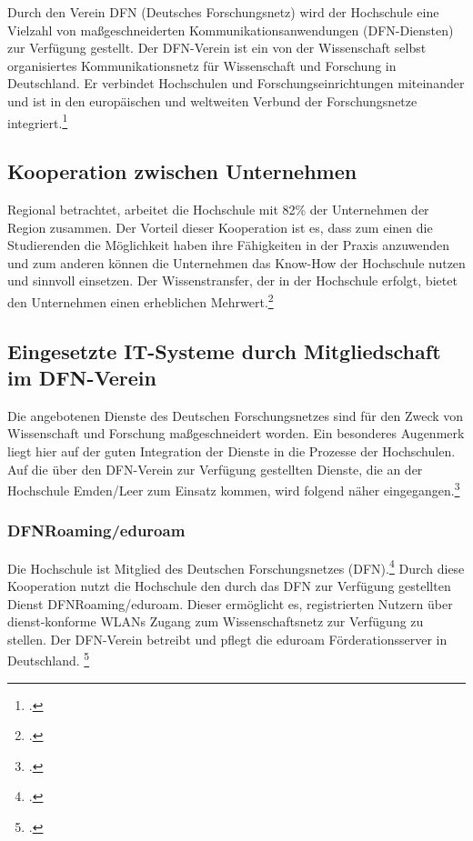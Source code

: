 Durch den Verein DFN (Deutsches Forschungsnetz) wird der Hochschule eine Vielzahl von maßgeschneiderten Kommunikationsanwendungen (DFN-Diensten) zur Verfügung gestellt. Der DFN-Verein ist ein von der Wissenschaft selbst organisiertes Kommunikationsnetz für Wissenschaft und Forschung in Deutschland. Er verbindet Hochschulen und Forschungseinrichtungen miteinander und ist in den europäischen und weltweiten  Verbund der Forschungsnetze integriert.\footcite[Vgl.][]{dfn_home_2015}

\subsection{Kooperation zwischen Unternehmen}
Regional betrachtet, arbeitet die Hochschule mit 82\% der Unternehmen der Region zusammen. Der Vorteil dieser Kooperation ist es, dass zum einen die Studierenden die Möglichkeit haben ihre Fähigkeiten in der Praxis anzuwenden und zum anderen können die Unternehmen das Know-How  der Hochschule nutzen und sinnvoll einsetzen. Der Wissenstransfer, der in der Hochschule erfolgt, bietet den Unternehmen einen erheblichen Mehrwert.\footcite[Vgl.][]{hsel_artikel_kooperation_unternehmen_2014}

\subsection{Eingesetzte IT-Systeme durch Mitgliedschaft im DFN-Verein}
Die angebotenen Dienste des Deutschen Forschungsnetzes sind für den Zweck von Wissenschaft und Forschung maßgeschneidert worden. Ein besonderes Augenmerk liegt hier auf der guten Integration der Dienste in die Prozesse der Hochschulen.  Auf die über den DFN-Verein zur Verfügung gestellten Dienste, die an der Hochschule Emden/Leer zum Einsatz kommen, wird folgend näher eingegangen.\footcite[Vgl.][]{dfn_dienste_2014}

\subsubsection{DFNRoaming/eduroam}
Die Hochschule ist Mitglied des Deutschen Forschungsnetzes (DFN).\footcite{dfn_mitgleider_2012} Durch diese Kooperation nutzt die Hochschule den durch das DFN zur Verfügung gestellten Dienst DFNRoaming/eduroam. Dieser ermöglicht es, registrierten Nutzern über dienst-konforme WLANs Zugang zum Wissenschaftsnetz zur Verfügung zu stellen. Der DFN-Verein betreibt und pflegt die eduroam Förderationsserver in Deutschland. \footcite[Vgl.][]{dfn_roaming_2015} 

